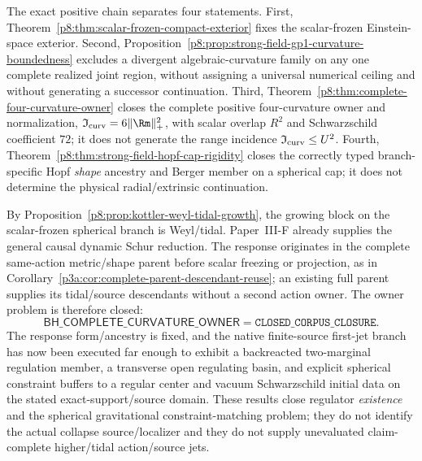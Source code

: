 \documentclass[12pt,a4paper]{article}
\begin{document}
\begin{remark}
\label{p8:rem:strong-field-status-boundary}
The exact positive chain separates four statements.  First,
Theorem~\ref{p8:thm:scalar-frozen-compact-exterior} fixes the scalar-frozen
Einstein-space exterior.  Second,
Proposition~\ref{p8:prop:strong-field-gp1-curvature-boundedness} excludes a
divergent algebraic-curvature family on any one complete realized joint region,
without assigning a universal numerical ceiling and without generating a
successor continuation.  Third,
Theorem~\ref{p8:thm:complete-four-curvature-owner} closes the complete positive
four-curvature owner and normalization,
\(\mathfrak I_{\rm curv}=6\lVert\Rm\rVert_+^2\), with scalar overlap
\(R^2\) and Schwarzschild coefficient \(72\); it does not generate the
range incidence \(\mathfrak I_{\rm curv}\le U^2\).  Fourth,
Theorem~\ref{p8:thm:strong-field-hopf-cap-rigidity} closes the correctly typed
branch-specific Hopf \emph{shape} ancestry and Berger member on a spherical cap;
it does not determine the physical radial/extrinsic continuation.

By Proposition~\ref{p8:prop:kottler-weyl-tidal-growth}, the growing block on
the scalar-frozen spherical branch is Weyl/tidal.  Paper~III-F already supplies
the general causal dynamic Schur reduction.  The response originates in the
complete same-action metric/shape parent before scalar freezing or projection,
as in Corollary~\ref{p3a:cor:complete-parent-descendant-reuse}; an existing full
parent supplies its tidal/source descendants without a second action owner.
The owner problem is therefore closed:
\[
 \boxed{
 \mathsf{BH\_COMPLETE\_CURVATURE\_OWNER}
 =\texttt{CLOSED\_CORPUS\_CLOSURE}.}
\]
The response form/ancestry is fixed, and the native finite-source first-jet
branch has now been executed far enough to exhibit a backreacted two-marginal
regulation member, a transverse open regulating basin, and explicit spherical
constraint buffers to a regular center and vacuum Schwarzschild initial data
on the stated exact-support/source domain.  These results close regulator
\emph{existence} and the spherical gravitational constraint-matching problem;
they do not identify the actual collapse source/localizer and they do not
supply unevaluated claim-complete higher/tidal action/source jets.


\end{remark}
\end{document}
